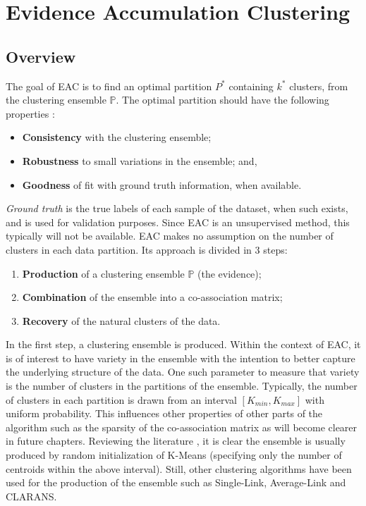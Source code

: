 
\section{Evidence Accumulation Clustering}
\label{sec:eac}

\subsection{Overview}

The goal of EAC is to find an optimal partition $P^*$ containing $k^*$ clusters, from the clustering ensemble $\mathbb{P}$. The optimal partition should have the following properties \cite{Fred2005}:

\begin{itemize}
    \item \textbf{Consistency} with the clustering ensemble;
    \item \textbf{Robustness} to small variations in the ensemble; and,
    \item \textbf{Goodness} of fit with ground truth information, when available.
\end{itemize}

\emph{Ground truth} is the true labels of each sample of the dataset, when such exists, and is used for validation purposes.
Since EAC is an unsupervised method, this typically will not be available.
EAC makes no assumption on the number of clusters in each data partition.
Its approach is divided in 3 steps:

\begin{enumerate}
\item \textbf{Production} of a clustering ensemble $\mathbb{P}$ (the evidence);
\item \textbf{Combination} of the ensemble into a co-association matrix;
\item \textbf{Recovery} of the natural clusters of the data.
\end{enumerate}

In the first step, a clustering ensemble is produced.
Within the context of EAC, it is of interest to have variety in the ensemble with the intention to better capture the underlying structure of the data.
One such parameter to measure that variety is the number of clusters in the partitions of the ensemble.
Typically, the number of clusters in each partition is drawn from an interval $[K_{min}, K_{max}]$ with uniform probability.
This influences other properties of other parts of the algorithm such as the sparsity of the co-association matrix as will become clearer in future chapters.
Reviewing the literature \cite{Fred2002,Fred2005,Lourenco2007,LourencoECG2009}, it is clear the ensemble is usually produced by random initialization of K-Means (specifying only the number of centroids within the above interval).
Still, other clustering algorithms have been used for the production of the ensemble \cite{Duarte2005} such as Single-Link, Average-Link and CLARANS.

